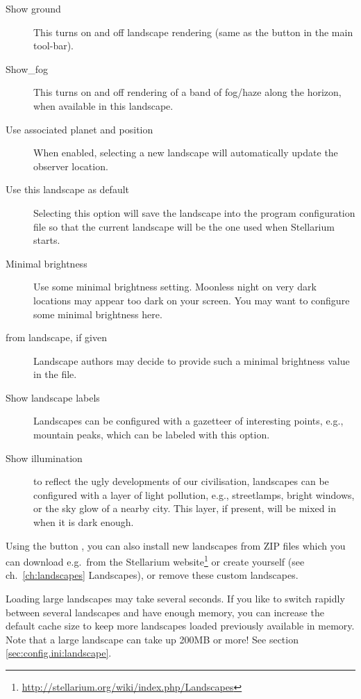 \begin{description}
\item[Show ground] This turns on and off landscape rendering (same
  as the button  in the main tool-bar).
\item[Show\_fog] This turns on and off rendering of a band of
  fog/haze along the horizon, when available in this landscape.
\item[Use associated planet and position] When enabled, selecting a
  new landscape will automatically update the observer location.
\item[Use this landscape as default] Selecting this option will save
  the landscape into the program configuration file so that the current
  landscape will be the one used when Stellarium starts.
\item[Minimal brightness] Use some minimal brightness
  setting. Moonless night on very dark locations may appear too dark
  on your screen. You may want to configure some minimal brightness
  here.
\item[from landscape, if given] Landscape authors may decide to
  provide such a minimal brightness value in the 
  file.
\item[Show landscape labels] Landscapes can be configured with a
  gazetteer of interesting points, e.g., mountain peaks, which can be
  labeled with this option.
\item[Show illumination] to reflect the ugly developments of our
  civilisation, landscapes can be configured with a layer of light
  pollution, e.g., streetlamps, bright windows, or the sky glow of a
  nearby city. This layer, if present, will be mixed in when it is
  dark enough.
\end{description}

\noindent Using the button , you can also
install new landscapes from ZIP files which you can download e.g.\
from the Stellarium
website\footnote{\url{http://stellarium.org/wiki/index.php/Landscapes}}
or create yourself (see ch.~\ref{ch:landscapes} Landscapes), or remove
these custom landscapes.

 Loading large landscapes may take several seconds. 
If you like to switch rapidly between several landscapes and have enough memory, 
you can increase the default cache size to keep more landscapes loaded previously 
available in memory. Note that a large landscape can take up 200MB or more! 
See section \ref{sec:config.ini:landscape}.

